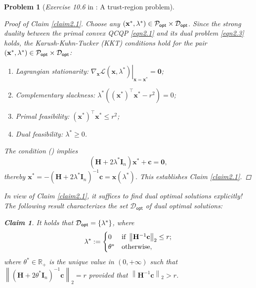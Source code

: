 \documentclass[11pt]{article}
\newtheorem{claim}{\sf Claim}
\newtheorem{problem}{Problem}
\numberwithin{equation}{problem}
\begin{document}
\begin{problem} [\emph{Exercise 10.6} in \cite{calafiore2014optimization}: A trust-region problem]
{\begin{proof} [Proof of Claim \ref{claim2.1}]
Choose any $\left( \mathbf{x}^*, \lambda^* \right) \in \mathcal{P}_{\textnormal{\textsf{opt}}} \times \mathcal{D}_{\textnormal{\textsf{opt}}}$. Since the strong duality between the primal convex QCQP \eqref{eqn2.1} and its dual problem \eqref{eqn2.3} holds, the Karush-Kuhn-Tucker (\textsf{KKT}) conditions hold for the pair $\left( \mathbf{x}^*, \lambda^* \right) \in \mathcal{P}_{\textnormal{\textsf{opt}}} \times \mathcal{D}_{\textnormal{\textsf{opt}}}$:
\begin{enumerate} [label=(\roman*)]
    \item Lagrangian stationarity: $\left. \nabla_{\mathbf{x}} \mathcal{L} \left( \mathbf{x}, \lambda^* \right) \right|_{\mathbf{x} = \mathbf{x}^*} = \mathbf{0}$;
    \item Complementary slackness: $\lambda^* \left( \left( \mathbf{x}^* \right)^{\top} \mathbf{x}^* - r^2 \right) = 0$;
    \item Primal feasibility: $\left( \mathbf{x}^* \right)^{\top} \mathbf{x}^* \leq r^2$;
    \item Dual feasibility: $\lambda^* \geq 0$.
\end{enumerate}
The condition () implies
\begin{equation*}
    \left( \mathbf{H} + 2 \lambda^* \mathbf{I}_n \right) \mathbf{x}^* + \mathbf{c} = \mathbf{0},
\end{equation*}
thereby $\mathbf{x}^* = - \left( \mathbf{H} + 2 \lambda^* \mathbf{I}_n \right)^{-1} \mathbf{c} = \mathbf{x} \left( \lambda^* \right)$. This establishes Claim \ref{claim2.1}.

\end{proof}

\indent In view of Claim \ref{claim2.1}, it suffices to find dual optimal solutions explicitly! The following result characterizes the set $\mathcal{D}_{\textsf{opt}}$ of dual optimal solutions:
\begin{claim}
\label{claim2.2}
It holds that $\mathcal{D}_{\textnormal{\textsf{opt}}} = \left\{ \lambda^* \right\}$, where
\begin{equation}
    \label{eqn2.4}
    \lambda^* :=
    \begin{cases}
        0 & \textnormal{if } \left\| \mathbf{H}^{-1} \mathbf{c} \right\|_2 \leq r; \\
        \theta^* & \textnormal{otherwise},
    \end{cases}
\end{equation}
where $\theta^* \in \mathbb{R}_{+}$ is the unique value in $\left( 0, +\infty \right)$ such that $\left\| \left( \mathbf{H} + 2 \theta^* \mathbf{I}_n \right)^{-1} \mathbf{c} \right\|_2 = r$ provided that $\left\| \mathbf{H}^{-1} \mathbf{c} \right\|_2 > r$.
\end{claim}

}
\end{problem}
\end{document}
